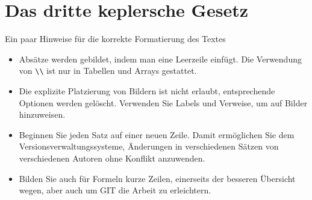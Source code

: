 %
%
%
%
\chapter{Das dritte keplersche Gesetz\label{chapter:kepler}}
\begin{refsection}

      Ein paar Hinweise für die korrekte Formatierung des Textes
      \begin{itemize}
            \item
                  Absätze werden gebildet, indem man eine Leerzeile einfügt.
                  Die Verwendung von \verb+\\+ ist nur in Tabellen und Arrays gestattet.
            \item
                  Die explizite Platzierung von Bildern ist nicht erlaubt, entsprechende
                  Optionen werden gelöscht.
                  Verwenden Sie Labels und Verweise, um auf Bilder hinzuweisen.
            \item
                  Beginnen Sie jeden Satz auf einer neuen Zeile.
                  Damit ermöglichen Sie dem Versionsverwaltungssysteme, Änderungen
                  in verschiedenen Sätzen von verschiedenen Autoren ohne Konflikt
                  anzuwenden.
            \item
                  Bilden Sie auch für Formeln kurze Zeilen, einerseits der besseren
                  Übersicht wegen, aber auch um GIT die Arbeit zu erleichtern.
      \end{itemize}



      
      
      
      

      \printbibliography[heading=subbibliography]
\end{refsection}
